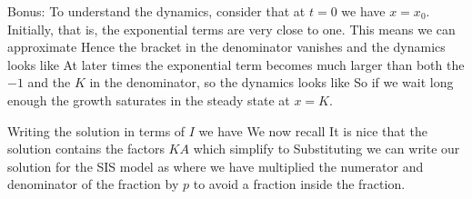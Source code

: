 Bonus: To understand the dynamics, consider that at $t=0$ we have $x=x_0$. Initially, that is, the exponential terms are very close to one. This means we can approximate 
Hence the bracket in the denominator vanishes and the dynamics looks like 
At later times the exponential term becomes much larger than both the $-1$ and the $K$ in the denominator, so the dynamics looks like
So if we wait long enough the growth saturates in the steady state at $x=K$.


\solution
Writing the solution in terms of $I$ we have 
We now recall 
It is nice that the solution contains the factors $KA$ which simplify to 
Substituting we can write our solution for the SIS model as
where we have multiplied the numerator and denominator of the fraction by $p$ to avoid a fraction inside the fraction. 

